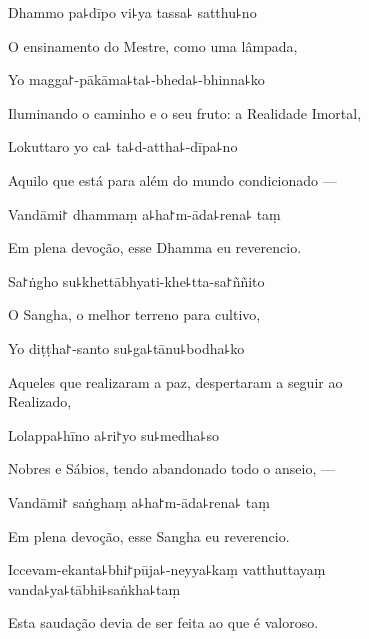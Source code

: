 Dhammo pa꜕dīpo vi꜕ya tassa꜕ satthu꜕no

\begin{english}
  O ensinamento do Mestre, como uma lâmpada,
\end{english}

Yo magga꜓-pākāma꜕ta꜕-bheda꜕-bhinna꜕ko

\begin{english}
  Iluminando o caminho e o seu fruto: a Realidade Imortal,
\end{english}

Lokuttaro yo ca꜕ ta꜕d-attha꜕-dīpa꜕no

\begin{english}
  Aquilo que está para além do mundo condicionado ---
\end{english}

Vandāmi꜓ dhammaṃ a꜕ha꜓m-āda꜕rena꜕ taṃ

\begin{english}
  Em plena devoção, esse Dhamma eu reverencio.
\end{english}

Sa꜓ṅgho su꜕khettābhyati-khe꜕tta-sa꜓ññito

\begin{english}
  O Sangha, o melhor terreno para cultivo,
\end{english}

Yo diṭṭha꜓-santo su꜕ga꜕tānu꜕bodha꜕ko

\begin{english}
  Aqueles que realizaram a paz, despertaram a seguir ao \\Realizado,
\end{english}

Lolappa꜕hīno a꜕ri꜓yo su꜕medha꜕so

\begin{english}
  Nobres e Sábios, tendo abandonado todo o anseio, ---
\end{english}

Vandāmi꜓ saṅghaṃ a꜕ha꜓m-āda꜕rena꜕ taṃ

\begin{english}
 Em plena devoção, esse Sangha eu reverencio.
\end{english}

Iccevam-ekanta꜕bhi꜓pūja꜕-neyya꜕kaṃ vatthuttayaṃ \\vanda꜕ya꜕tābhi꜕saṅkha꜕taṃ

\begin{english}
 Esta saudação devia de ser feita ao que é valoroso.
\end{english}

